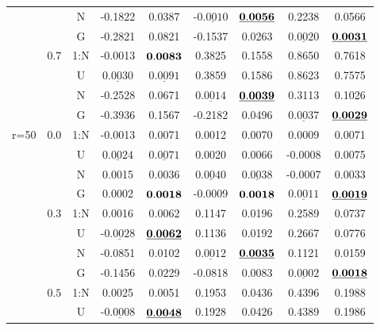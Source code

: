 \documentclass[12pt]{article}
\newcommand{\ul}{\underline}
\begin{document}
\begin{table}[htp!]
\begin{center}
{\begin{tabular}{|c|c|c|c|c|c|c|c|c| }
	&	   &N&    -0.1822  & 0.0387  &-$\ul{0.0010}$  &${\bf\ul{ 0.0056}}$ & 0.2238  & 0.0566    \\
&		   &G&    -0.2821  & 0.0821  & -0.1537  & 0.0263 &$\ul{ 0.0020}$  &${\bf\ul{ 0.0031}}$  \\
		\cline{2-9}	
	&	 $0.7$&1:N&    -0.0013  &${\bf 0.0083}$    & 0.3825  & 0.1558 & 0.8650  & 0.7618    \\
&		   &U&$\ul{    0.0030}$  &$\ul{ 0.0091}$  & 0.3859  & 0.1586 & 0.8623  & 0.7575    \\
&		   &N&    -0.2528  & 0.0671    &$\ul{ 0.0014}$  &${\bf\ul{ 0.0039}}$ & 0.3113  & 0.1026    \\
&		   &G&    -0.3936  & 0.1567    & -0.2182  & 0.0496  &$\ul{ 0.0037}$  &${\bf\ul{ 0.0029}}$   \\ \hline
 \multirow{15}{1cm}{r=50}&   $0.0$&1:N&    -0.0013  & 0.0071  & 0.0012  & 0.0070 & 0.0009  & 0.0071  \\
		&   &U&$\ul{    0.0024}$  &$\ul{ 0.0071}$  & 0.0020  & 0.0066 & -0.0008  & 0.0075  \\
		&   &N&    0.0015  & 0.0036  &$\ul{ 0.0040}$  &$\ul{ 0.0038}$ & -0.0007  & 0.0033  \\
		&   &G&    0.0002  &${\bf 0.0018}$  & -0.0009  &${\bf 0.0018}$ &$\ul{ 0.0011}$  &${\bf\ul{ 0.0019}}$  \\
        \cline{2-9}
    &     $0.3$&1:N&    0.0016  & 0.0062  & 0.1147  & 0.0196 & 0.2589  & 0.0737    \\
	&	   &U&-$\ul{0.0028}$  &${\bf\ul{ 0.0062}}$  & 0.1136  & 0.0192 & 0.2667  & 0.0776    \\
	 &      &N&    -0.0851  & 0.0102  &$\ul{ 0.0012}$  &${\bf\ul{ 0.0035}}$ & 0.1121  & 0.0159    \\
&		   &G&    -0.1456  & 0.0229  & -0.0818  & 0.0083 &$\ul{ 0.0002}$  & ${\bf\ul{0.0018}}$  \\
	\cline{2-9}
 &		 $0.5$&1:N&    0.0025  & 0.0051    & 0.1953  & 0.0436 & 0.4396  & 0.1988    \\
&		   &U&-$\ul{0.0008}$  &${\bf\ul{ 0.0048}}$  & 0.1928  & 0.0426 & 0.4389  & 0.1986    \\

\end{tabular}}
\end{center}
\end{table}
\end{document}
